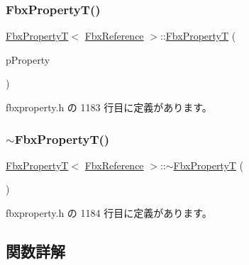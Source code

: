 \subsubsection{\texorpdfstring{Fbx\+Property\+T()}{FbxPropertyT()}\hspace{0.1cm}{\footnotesize\ttfamily [2/2]}}
{\footnotesize\ttfamily \hyperlink{class_fbx_property_t}{Fbx\+PropertyT}$<$ \hyperlink{fbxtypes_8h_a44df6a2eec915cf27cd481e5c5e48a24}{Fbx\+Reference} $>$\+::\hyperlink{class_fbx_property_t}{Fbx\+PropertyT} (\begin{DoxyParamCaption}\item[{const \hyperlink{class_fbx_property}{Fbx\+Property} \&}]{p\+Property }\end{DoxyParamCaption})\hspace{0.3cm}{\ttfamily [inline]}}



 fbxproperty.\+h の 1183 行目に定義があります。

\mbox{\label{class_fbx_property_t_3_01_fbx_reference_01_4_ab4d98649c0348f55f31f43302a41a7b0}} 
\subsubsection{\texorpdfstring{$\sim$\+Fbx\+Property\+T()}{~FbxPropertyT()}}
{\footnotesize\ttfamily \hyperlink{class_fbx_property_t}{Fbx\+PropertyT}$<$ \hyperlink{fbxtypes_8h_a44df6a2eec915cf27cd481e5c5e48a24}{Fbx\+Reference} $>$\+::$\sim$\hyperlink{class_fbx_property_t}{Fbx\+PropertyT} (\begin{DoxyParamCaption}{ }\end{DoxyParamCaption})\hspace{0.3cm}{\ttfamily [inline]}}



 fbxproperty.\+h の 1184 行目に定義があります。



\subsection{関数詳解}
\mbox{\label{class_fbx_property_t_3_01_fbx_reference_01_4_a91552cfa2847dc9bd6ec37dff19f1e67}} 
